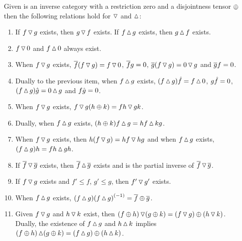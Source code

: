 \begin{lemma}\label{lem:properties_of_tjleft_and_tjright}
  Given \X is an inverse category with a restriction zero and a disjointness tensor $\+$ then the
  following relations hold for $\tjleft$ and $\tjright$:
   \begin{enumerate}[{(}i{)}]
    \item If $f \tjleft g$ exists, then $g \tjleft f$ exists. If $f \tjright g$ exists, then
    $g \tjright f$ exists. \label{lemitem:l_r_commute}
    \item $f \tjleft 0$ and $f \tjright 0$ always exist. \label{lemitem:l_r_zero_exists}
    \item When $f\tjleft g$ exists, $\rst{f}(f\tjleft g) = f \tjleft 0$, $\rst{f}g = 0$,
      $\rst{g}(f \tjleft g) = 0 \tjleft g$ and $\rst{g}f = 0$.
      \label{lemitem:l_r_rst_orthogonal_to_zero}
    \item Dually to the previous item, when $f\tjright g$ exists,
      $(f\tjright g)\rg{f} = f \tjright 0$, $g\rg{f} = 0$, $(f \tjright g)\rg{g} = 0 \tjright g$ and
      $f\rg{g} = 0$.\label{lemitem:l_r_rg_orthogonal_to_zero}
    \item When $f\tjleft g$ exists, $f\tjleft g (h\+k) = f h \tjleft g k$.
      \label{lemitem:l_r_l_pull_right}
    \item Dually, when $f \tjright g$ exists, $(h \+ k) f \tjright g = h f \tjright k g$.
      \label{lemitem:l_r_r_pull_left}
    \item When $f \tjleft g$ exists, then $h(f \tjleft g) = h f \tjleft hg$ and when $f \tjright g$
      exists, $(f \tjright g)h = f h \tjright g h$.
      \label{lemitem:l_r_l_universal_r_stable}
    \item If $\rst{f} \tjleft \rst{g}$ exists, then $\rst{f} \tjright \rst{g}$ exists and is
      the partial inverse of $\rst{f} \tjleft \rst{g}$.
      \label{lemitem:l_r_rst_inverses}
    \item If $f\tjleft g$ exists and $f' \le f$, $g' \le g$, then $f' \tjleft g'$ exists.
      \label{lemitem:l_r_less_than}
    \item When $f\tjright g$ exists, $(f\tjright g) \inv{(f\tjright g)} = \rst{f}\+\rst{g}$.
      \label{lemitem:l_r_rst_is_natural}
    \item Given $f\tjleft g$ and $h\tjleft k$ exist, then
      $(f\+h)\tjleft(g\+k) = (f\tjleft g)\+ (h\tjleft k)$. Dually, the existence of $f\tjright g$
      and $h\tjright k$ implies $(f\+h)\tjright(g\+k) = (f\tjright g)\+ (h\tjright k)$.
      \label{lemitem:l_r_preserve_tensor}
  \end{enumerate}
\end{lemma}
